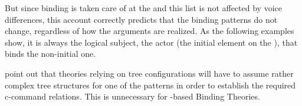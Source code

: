 \documentclass[output=paper,biblatex,babelshorthands,newtxmath,draftmode,colorlinks,citecolor=brown]{langscibook}
\begin{document}
\largerpage
But since binding is taken care of at the \argstl and this list is not affected by voice
differences, this account correctly predicts that the binding patterns do not change, 
regardless of how the arguments are realized. 
As the following examples show, it is always the logical subject, the
actor (the initial element on the \argstl), that binds the non-initial one.
\eal
{}
\zl
\eal
{}
\zl

\citet[]{MS98a} point out that theories relying on tree configurations will have to assume
rather complex tree structures for one of the patterns in order to establish the required c-command
relations. This is unnecessary for \argst-based Binding Theories.
\end{document}
